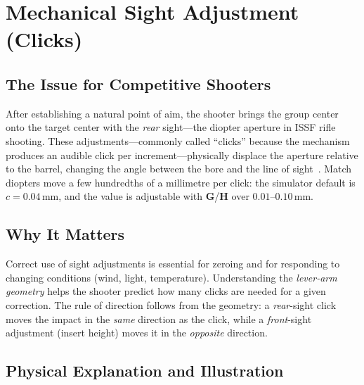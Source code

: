 \documentclass[11pt]{article}
\newcommand{\key}[1]{\textsf{\textbf{#1}}}
\begin{document}
\section{Mechanical Sight Adjustment (Clicks)}\label{sec:clicks}

\subsection{The Issue for Competitive Shooters}
After establishing a natural point of aim, the shooter brings the
group center onto the target center with the \emph{rear} sight---the
diopter aperture in ISSF rifle shooting.  These adjustments---commonly
called ``clicks'' because the mechanism produces an audible click per
increment---physically displace the aperture relative to the barrel,
changing the angle between the bore and the line of
sight~\cite{nra}.  Match diopters move a few hundredths of a
millimetre per click: the simulator default is $c = 0.04$\,mm, and the
value is adjustable with \key{G}/\key{H} over $0.01$--$0.10$\,mm.

\subsection{Why It Matters}
Correct use of sight adjustments is essential for zeroing and for
responding to changing conditions (wind, light, temperature).
Understanding the \emph{lever-arm geometry} helps the shooter predict
how many clicks are needed for a given correction.  The rule of
direction follows from the geometry: a \emph{rear}-sight click moves
the impact in the \emph{same} direction as the click, while a
\emph{front}-sight adjustment (insert height) moves it in the
\emph{opposite} direction.

\subsection{Physical Explanation and Illustration}
\end{document}
